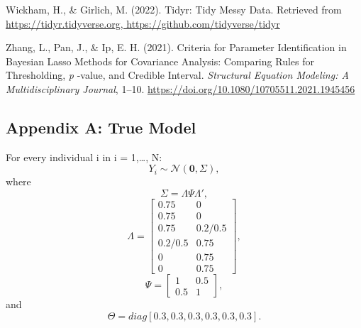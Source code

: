 \documentclass[
  man, donotrepeattitle,floatsintext]{apa6}
\newlength{\cslhangindent}
\newlength{\cslentryspacingunit} %
\newenvironment{CSLReferences}[2] %
 {%
  \setlength{\parindent}{0pt}
  \ifodd #1
  \let\oldpar\par
  \def\par{\hangindent=\cslhangindent\oldpar}
  \fi
  \setlength{\parskip}{#2\cslentryspacingunit}
 }%
 {}
\begin{document}
\begin{CSLReferences}{1}{0}
\leavevmode{}%
Wickham, H., \& Girlich, M. (2022). Tidyr: {Tidy} {Messy} {Data}. Retrieved from \href{https://tidyr.tidyverse.org,\%20https://github.com/tidyverse/tidyr}{https://tidyr.tidyverse.org, https://github.com/tidyverse/tidyr}

\leavevmode{}%
Zhang, L., Pan, J., \& Ip, E. H. (2021). Criteria for {Parameter} {Identification} in {Bayesian} {Lasso} {Methods} for {Covariance} {Analysis}: {Comparing} {Rules} for {Thresholding}, \emph{p} -value, and {Credible} {Interval}. \emph{Structural Equation Modeling: A Multidisciplinary Journal}, 1--10. \url{https://doi.org/10.1080/10705511.2021.1945456}

\end{CSLReferences}

\endgroup


\clearpage
\makeatletter
\efloat@restorefloats
\makeatother


\begin{appendix}
\section{}
\hypertarget{appendix-a-true-model}{%
\subsection{Appendix A: True Model}\label{appendix-a-true-model}}

For every individual i in i = 1,\ldots, N:
\[Y_i \sim \mathcal{N}(\mathbf{0}, \Sigma),\] where
\[\Sigma = \Lambda\Psi\Lambda',\] \[\Lambda = 
\begin{bmatrix}
0.75 & 0 \\
0.75 & 0 \\
0.75 & 0.2/0.5 \\
0.2/0.5 & 0.75 \\
0 & 0.75 \\
0 & 0.75
\end{bmatrix},\] \[\Psi =
\begin{bmatrix}
1 & 0.5 \\
0.5 & 1
\end{bmatrix}
,\] and \[\Theta = diag[0.3, 0.3, 0.3, 0.3, 0.3, 0.3].\]
\end{appendix}
\end{document}
